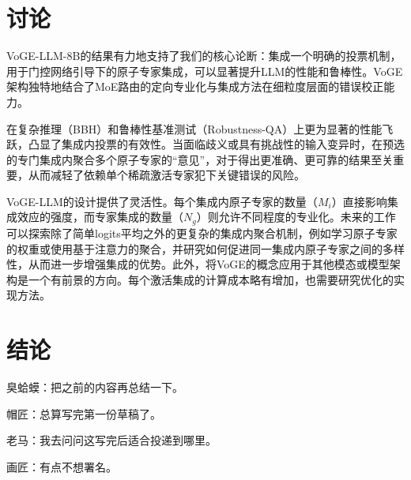 \section{讨论}
VoGE-LLM-8B的结果有力地支持了我们的核心论断：集成一个明确的投票机制，用于门控网络引导下的原子专家集成，可以显著提升LLM的性能和鲁棒性。VoGE架构独特地结合了MoE路由的定向专业化与集成方法在细粒度层面的错误校正能力。

在复杂推理（BBH）和鲁棒性基准测试（Robustness-QA）上更为显著的性能飞跃，凸显了集成内投票的有效性。当面临歧义或具有挑战性的输入变异时，在预选的专门集成内聚合多个原子专家的“意见”，对于得出更准确、更可靠的结果至关重要，从而减轻了依赖单个稀疏激活专家犯下关键错误的风险。

VoGE-LLM的设计提供了灵活性。每个集成内原子专家的数量（\(M_i\)）直接影响集成效应的强度，而专家集成的数量（\(N_g\)）则允许不同程度的专业化。未来的工作可以探索除了简单logits平均之外的更复杂的集成内聚合机制，例如学习原子专家的权重或使用基于注意力的聚合，并研究如何促进同一集成内原子专家之间的多样性，从而进一步增强集成的优势。此外，将VoGE的概念应用于其他模态或模型架构是一个有前景的方向。每个激活集成的计算成本略有增加，也需要研究优化的实现方法。

\section{结论}
{\kaiti 臭蛤蟆：把之前的内容再总结一下。}

{\kaiti 帽匠：总算写完第一份草稿了。}

{\kaiti 老马：我去问问这写完后适合投递到哪里。}

{\kaiti 画匠：有点不想署名。}
